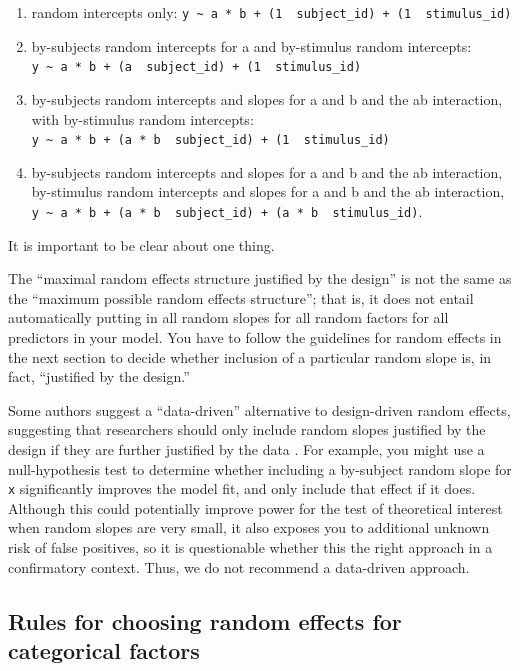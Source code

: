 \documentclass[]{book}
\providecommand{\tightlist}{%
  \setlength{\itemsep}{0pt}\setlength{\parskip}{0pt}}
\begin{document}
\begin{enumerate}
\def\labelenumi{\arabic{enumi}.}
\tightlist
\item
  random intercepts only: \texttt{y\ \textasciitilde{}\ a\ *\ b\ +\ (1\ \textbar{}\ subject\_id)\ +\ (1\ \textbar{}\ stimulus\_id)}
\item
  by-subjects random intercepts for a and by-stimulus random intercepts: \texttt{y\ \textasciitilde{}\ a\ *\ b\ +\ (a\ \textbar{}\ subject\_id)\ +\ (1\ \textbar{}\ stimulus\_id)}
\item
  by-subjects random intercepts and slopes for a and b and the ab interaction, with by-stimulus random intercepts: \texttt{y\ \textasciitilde{}\ a\ *\ b\ +\ (a\ *\ b\ \textbar{}\ subject\_id)\ +\ (1\ \textbar{}\ stimulus\_id)}
\item
  by-subjects random intercepts and slopes for a and b and the ab interaction, by-stimulus random intercepts and slopes for a and b and the ab interaction, \texttt{y\ \textasciitilde{}\ a\ *\ b\ +\ (a\ *\ b\ \textbar{}\ subject\_id)\ +\ (a\ *\ b\ \textbar{}\ stimulus\_id)}.
\end{enumerate}

It is important to be clear about one thing.

The ``maximal random effects structure justified by the design'' is not the same as the ``maximum possible random effects structure''; that is, it does not entail automatically putting in all random slopes for all random factors for all predictors in your model. You have to follow the guidelines for random effects in the next section to decide whether inclusion of a particular random slope is, in fact, ``justified by the design.''

Some authors suggest a ``data-driven'' alternative to design-driven random effects, suggesting that researchers should only include random slopes justified by the design if they are further justified by the data \citep{Matuschek_et_al_2017}. For example, you might use a null-hypothesis test to determine whether including a by-subject random slope for \texttt{x} significantly improves the model fit, and only include that effect if it does. Although this could potentially improve power for the test of theoretical interest when random slopes are very small, it also exposes you to additional unknown risk of false positives, so it is questionable whether this the right approach in a confirmatory context. Thus, we do not recommend a data-driven approach.

\hypertarget{rules-for-choosing-random-effects-for-categorical-factors}{%
\subsection{Rules for choosing random effects for categorical factors}\label{rules-for-choosing-random-effects-for-categorical-factors}}
\end{document}
